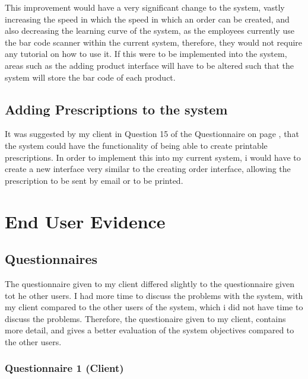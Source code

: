 This improvement would have a very significant change to the system, vastly increasing the speed in which the speed in which an order can be created, and also decreasing the learning curve of the system, as the employees currently use the bar code scanner within the current system, therefore, they would not require any tutorial on how to use it. If this were to be implemented into the system, areas such as the adding product interface will have to be altered such that the system will store the bar code of each product.

\subsection{Adding Prescriptions to the system}
It was suggested by my client in Question 15 of the Questionnaire  on page \pageref{Client-Q1}, that the system could have the functionality of being able to create printable prescriptions. In order to implement this into my current system, i would have to create a new interface very similar to the creating order interface, allowing the prescription to be sent by email or to be printed.



\pagebreak
\section{End User Evidence}

\pagebreak
\subsection{Questionnaires}

The questionnaire given to my client differed slightly to the questionnaire given tot he other users. I had more time to discuss the problems with the system, with my client compared to the other users of the system, which i did not have time to discuss the problems. Therefore, the questionaire given to my client, contains more detail, and gives a better evaluation of the system objectives compared to the other users.

\subsubsection{Questionnaire 1 (Client)}

\label{Client-Q1}




\label{Client-Q11}





